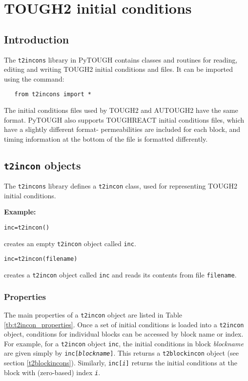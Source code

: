 \chapter{TOUGH2 initial conditions}
\label{incons}

\section{Introduction}
The \texttt{t2incons} library in PyTOUGH contains classes and routines for reading, editing and writing TOUGH2 initial conditions and files.  It can be imported using the command:

\begin{verbatim}
   from t2incons import *
\end{verbatim}

The initial conditions files used by TOUGH2 and AUTOUGH2 have the same format.  PyTOUGH also supports TOUGHREACT initial conditions files, which have a slightly different format- permeabilities are included for each block, and timing information at the bottom of the file is formatted differently.

\section{\texttt{t2incon} objects}

The \texttt{t2incons} library defines a \texttt{t2incon} class, used for representing TOUGH2 initial conditions.

\textbf{Example:}

\begin{verbatim}
inc=t2incon()
\end{verbatim}

creates an empty \texttt{t2incon} object called \texttt{inc}.

\begin{verbatim}
inc=t2incon(filename)
\end{verbatim}

creates a \texttt{t2incon} object called \texttt{inc} and reads its contents from file \texttt{filename}.

\subsection{Properties}

The main properties of a \texttt{t2incon} object are listed in Table \ref{tb:t2incon_properties}.  Once a set of initial conditions is loaded into a \texttt{t2incon} object, conditions for individual blocks can be accessed by block name or index.  For example, for a \texttt{t2incon} object \texttt{inc}, the initial conditions in block \emph{blockname} are given simply by \texttt{inc[\emph{blockname}]}.  This returns a \texttt{t2blockincon} object (see section \ref{t2blockincons}).  Similarly, \texttt{inc[\emph{i}]} returns the initial conditions at the block with (zero-based) index \texttt{\emph{i}}.

